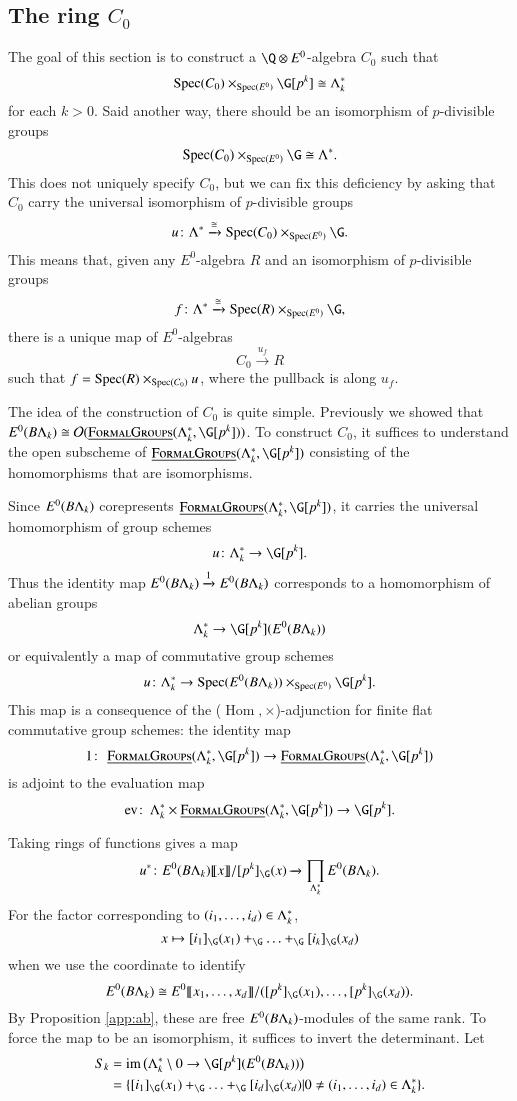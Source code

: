 \subsection*{The ring $C_0$}


The goal of this section is to construct a $\Q \otimes E^0$-algebra $C_0$ such that
\[
\Spec(C_0) \times_{\Spec(E^0)} \G[p^k] \cong \Lambda_{k}^*
\]
for each $k>0$. Said another way, there should be an isomorphism of $p$-divisible groups
\[
\Spec(C_0) \times_{\Spec(E^0)} \G \cong \Lambda^*.
\]
This does not uniquely specify $C_0$, but we can fix this deficiency by asking that $C_0$ carry the universal isomorphism of $p$-divisible groups 
\[
u \colon \Lambda^* \xrightarrow{\cong} \Spec(C_0) \times_{\Spec(E^0)} \G.
\]
This means that, given any $E^0$-algebra $R$ and an isomorphism of $p$-divisible groups
\[
f \colon \Lambda^* \xrightarrow{\cong} \Spec(R) \times_{\Spec(E^0)} \G,
\]
there is a unique map of $E^0$-algebras
\[
C_0 \xrightarrow{u_f} R
\]
such that $f = \operatorname{Spec}(R) \times_{\operatorname{Spec}(C_0)} u$, where the pullback is along $u_f$.

The idea of the construction of $C_0$ is quite simple. Previously we showed that $E^0(B\Lk) \cong \sheaf O(\InternalHom{FormalGroups}(\Lk^*,\G[p^k]))$. To construct $C_0$, it suffices to understand the open subscheme of $\InternalHom{FormalGroups}(\Lk^*,\G[p^k])$ consisting of the homomorphisms that are isomorphisms. 

Since $E^0(B\Lambda_k)$ corepresents $\InternalHom{FormalGroups}(\Lk^*,\G[p^k])$, it carries the universal homomorphism of group schemes
\[
u \colon \Lk^* \rightarrow \G[p^k].
\]
Thus the identity map $E^0(B\Lambda_k) \xrightarrow{1} E^0(B\Lambda_k)$ corresponds to a homomorphism of abelian groups
\[
\Lk^* \rightarrow \G[p^k](E^0(B\Lk))
\]
or equivalently a map of commutative group schemes
\[
u \colon \Lk^* \rightarrow \Spec(E^0(B\Lk)) \times_{\Spec(E^0)} \G[p^k].
\]
This map is a consequence of the ($\operatorname{Hom}, \times$)-adjunction for finite flat commutative group schemes: the identity map
\[
1 \co \InternalHom{FormalGroups}(\Lk^*,\G[p^k]) \to \InternalHom{FormalGroups}(\Lk^*,\G[p^k])
\]
is adjoint to the evaluation map
\[
\mathrm{ev} \co \Lk^* \times  \InternalHom{FormalGroups}(\Lk^*,\G[p^k]) \to \G[p^k].
\]

Taking rings of functions gives a map
\[
u^* \colon E^0(B\Lk)\ps{x}/[p^k]_{\G}(x) \xrightarrow{} \prod_{\Lk^*} E^0(B\Lk).
\]
For the factor corresponding to $(i_1, \ldots, i_d) \in \Lambda_k^*$, 
\[
x \mapsto [i_1]_{\G}(x_1)+_{\G} \ldots +_{\G} [i_k]_{\G}(x_d)
\]
when we use the coordinate to identify
\[
E^0(B\Lk) \cong E^0\ps{x_1, \ldots, x_d}/([p^k]_{\G}(x_1), \ldots, [p^k]_{\G}(x_d)). 
\]
By Proposition \ref{app:ab}, these are free $E^0(B\Lambda_k)$-modules of the same rank. To force the map to be an isomorphism, it suffices to invert the determinant. Let 
\begin{align*}
S_k &= \im \big (\Lk^* \setminus 0 \rightarrow \G[p^k](E^0(B\Lk)) \big ) \\ &= \{ [i_1]_{\G}(x_1)+_{\G} \ldots +_{\G} [i_d]_{\G}(x_d)| 0 \neq (i_1, \ldots, i_d) \in \Lk^* \}.
\end{align*}

